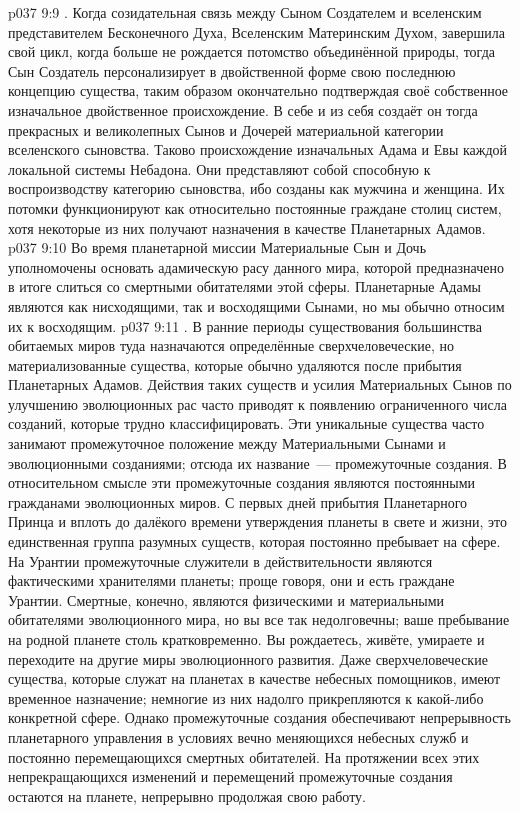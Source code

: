 \vs p037 9:9 \pc {}. Когда созидательная связь между Сыном Создателем и вселенским представителем Бесконечного Духа, Вселенским Материнским Духом, завершила свой цикл, когда больше не рождается потомство объединённой природы, тогда Сын Создатель персонализирует в двойственной форме свою последнюю концепцию существа, таким образом окончательно подтверждая своё собственное изначальное двойственное происхождение. В себе и из себя создаёт он тогда прекрасных и великолепных Сынов и Дочерей материальной категории вселенского сыновства. Таково происхождение изначальных Адама и Евы каждой локальной системы Небадона. Они представляют собой способную к воспроизводству категорию сыновства, ибо созданы как мужчина и женщина. Их потомки функционируют как относительно постоянные граждане столиц систем, хотя некоторые из них получают назначения в качестве Планетарных Адамов.
\vs p037 9:10 Во время планетарной миссии Материальные Сын и Дочь уполномочены основать адамическую расу данного мира, которой предназначено в итоге слиться со смертными обитателями этой сферы. Планетарные Адамы являются как нисходящими, так и восходящими Сынами, но мы обычно относим их к восходящим.
\vs p037 9:11 \pc {}. В ранние периоды существования большинства обитаемых миров туда назначаются определённые сверхчеловеческие, но материализованные существа, которые обычно удаляются после прибытия Планетарных Адамов. Действия таких существ и усилия Материальных Сынов по улучшению эволюционных рас часто приводят к появлению ограниченного числа созданий, которые трудно классифицировать. Эти уникальные существа часто занимают промежуточное положение между Материальными Сынами и эволюционными созданиями; отсюда их название~--- промежуточные создания. В относительном смысле эти промежуточные создания являются постоянными гражданами эволюционных миров. С первых дней прибытия Планетарного Принца и вплоть до далёкого времени утверждения планеты в свете и жизни, это единственная группа разумных существ, которая постоянно пребывает на сфере. На Урантии промежуточные служители в действительности являются фактическими хранителями планеты; проще говоря, они и есть граждане Урантии. Смертные, конечно, являются физическими и материальными обитателями эволюционного мира, но вы все так недолговечны; ваше пребывание на родной планете столь кратковременно. Вы рождаетесь, живёте, умираете и переходите на другие миры эволюционного развития. Даже сверхчеловеческие существа, которые служат на планетах в качестве небесных помощников, имеют временное назначение; немногие из них надолго прикрепляются к какой\hyp{}либо конкретной сфере. Однако промежуточные создания обеспечивают непрерывность планетарного управления в условиях вечно меняющихся небесных служб и постоянно перемещающихся смертных обитателей. На протяжении всех этих непрекращающихся изменений и перемещений промежуточные создания остаются на планете, непрерывно продолжая свою работу.
